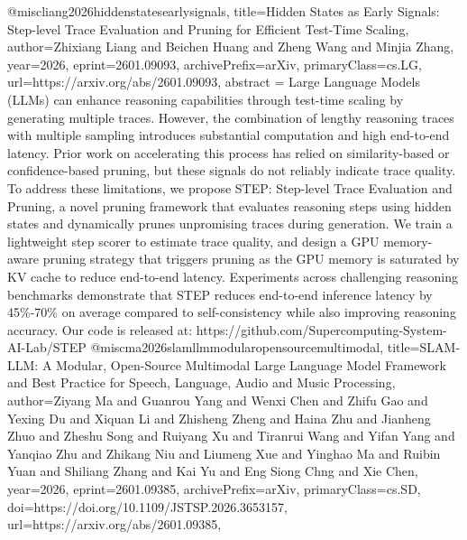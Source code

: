{}@misc{liang2026hiddenstatesearlysignals,
      title={Hidden States as Early Signals: Step-level Trace Evaluation and Pruning for Efficient Test-Time Scaling}, 
      author={Zhixiang Liang and Beichen Huang and Zheng Wang and Minjia Zhang},
      year={2026},
      eprint={2601.09093},
      archivePrefix={arXiv},
      primaryClass={cs.LG},
      url={https://arxiv.org/abs/2601.09093},
      abstract = {Large Language Models (LLMs) can enhance reasoning capabilities through test-time scaling by generating multiple traces. However, the combination of lengthy reasoning traces with multiple sampling introduces substantial computation and high end-to-end latency. Prior work on accelerating this process has relied on similarity-based or confidence-based pruning, but these signals do not reliably indicate trace quality. To address these limitations, we propose STEP: Step-level Trace Evaluation and Pruning, a novel pruning framework that evaluates reasoning steps using hidden states and dynamically prunes unpromising traces during generation. We train a lightweight step scorer to estimate trace quality, and design a GPU memory-aware pruning strategy that triggers pruning as the GPU memory is saturated by KV cache to reduce end-to-end latency. Experiments across challenging reasoning benchmarks demonstrate that STEP reduces end-to-end inference latency by 45\%-70\% on average compared to self-consistency while also improving reasoning accuracy. Our code is released at: https://github.com/Supercomputing-System-AI-Lab/STEP}
}@misc{ma2026slamllmmodularopensourcemultimodal,
      title={SLAM-LLM: A Modular, Open-Source Multimodal Large Language Model Framework and Best Practice for Speech, Language, Audio and Music Processing}, 
      author={Ziyang Ma and Guanrou Yang and Wenxi Chen and Zhifu Gao and Yexing Du and Xiquan Li and Zhisheng Zheng and Haina Zhu and Jianheng Zhuo and Zheshu Song and Ruiyang Xu and Tiranrui Wang and Yifan Yang and Yanqiao Zhu and Zhikang Niu and Liumeng Xue and Yinghao Ma and Ruibin Yuan and Shiliang Zhang and Kai Yu and Eng Siong Chng and Xie Chen},
      year={2026},
      eprint={2601.09385},
      archivePrefix={arXiv},
      primaryClass={cs.SD},
      doi={https://doi.org/10.1109/JSTSP.2026.3653157},
      url={https://arxiv.org/abs/2601.09385},
}
